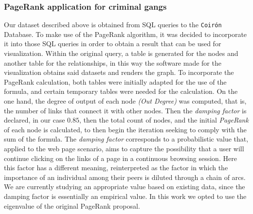 \subsubsection{PageRank application for criminal gangs}
Our dataset described above is obtained from SQL queries to the \texttt{Coirón} Database. To make use of the PageRank algorithm, it was decided to incorporate it into those SQL queries in order to obtain a result that can be used for visualization. Within the original query, a table is generated for the nodes and another table for the relationships, in this way the software made for the visualization obtains said datasets and renders the graph.
To incorporate the PageRank calculation, both tables were initially adapted for the use of the formula, and certain temporary tables were needed for the calculation. On the one hand, the degree of output of each node \textit{(Out Degree)} was computed, that is, the number of links that connect it with other nodes.
Then the \textit{damping factor} is declared, in our case $0.85$, then the total count of nodes, and the initial \textit{PageRank} of each node is calculated, to then begin the iteration seeking to comply with the sum of the formula.
The \textit{damping factor} corresponds to a probabilistic value that, applied to the web page scenario, aims to capture the possibility that a user will continue clicking on the links of a page in a continuous browsing session.
Here this factor has a different meaning, reinterpreted as the factor in which the importance of an individual among their peers is diluted through a chain of arcs. We are currently studying an appropriate value based on existing data, since the damping factor is essentially an empirical value. In this work we opted to use the eigenvalue of the original PageRank proposal.
